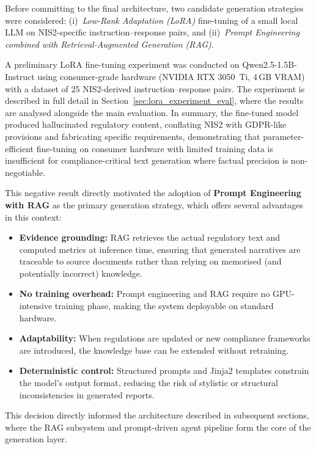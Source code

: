 \documentclass[]{UCD_CS_FYP_Report}
\begin{document}
Before committing to the final architecture, two candidate generation strategies were considered: (i)~\textit{Low-Rank Adaptation (LoRA)}\cite{LoRA2021} fine-tuning of a small local LLM on NIS2-specific instruction--response pairs, and (ii)~\textit{Prompt Engineering combined with Retrieval-Augmented Generation (RAG)}.

A preliminary LoRA fine-tuning experiment was conducted on Qwen2.5-1.5B-Instruct using consumer-grade hardware (NVIDIA RTX 3050~Ti, 4\,GB VRAM) with a dataset of 25 NIS2-derived instruction--response pairs. The experiment is described in full detail in Section~\ref{sec:lora_experiment_eval}, where the results are analysed alongside the main evaluation. In summary, the fine-tuned model produced hallucinated regulatory content, conflating NIS2 with GDPR-like provisions and fabricating specific requirements, demonstrating that parameter-efficient fine-tuning on consumer hardware with limited training data is insufficient for compliance-critical text generation where factual precision is non-negotiable.

This negative result directly motivated the adoption of \textbf{Prompt Engineering with RAG} as the primary generation strategy, which offers several advantages in this context:

\begin{itemize}
    \item \textbf{Evidence grounding:} RAG retrieves the actual regulatory text and computed metrics at inference time, ensuring that generated narratives are traceable to source documents rather than relying on memorised (and potentially incorrect) knowledge.
    \item \textbf{No training overhead:} Prompt engineering and RAG require no GPU-intensive training phase, making the system deployable on standard hardware.
    \item \textbf{Adaptability:} When regulations are updated or new compliance frameworks are introduced, the knowledge base can be extended without retraining.
    \item \textbf{Deterministic control:} Structured prompts and Jinja2 templates constrain the model's output format, reducing the risk of stylistic or structural inconsistencies in generated reports.
\end{itemize}

This decision directly informed the architecture described in subsequent sections, where the RAG subsystem and prompt-driven agent pipeline form the core of the generation layer.
\end{document}
